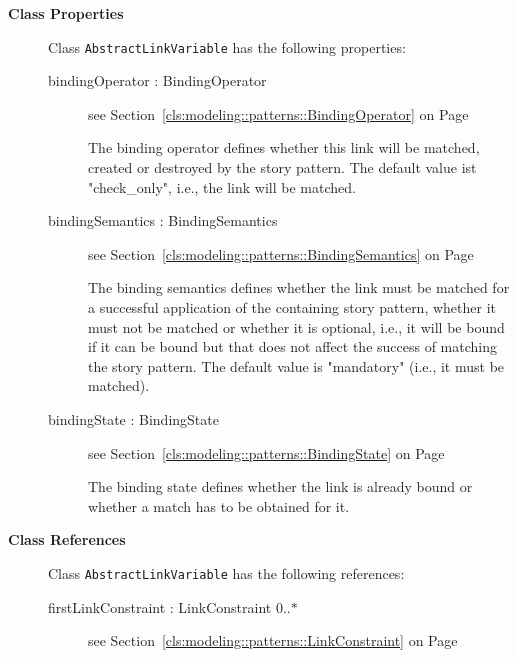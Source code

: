 \begin{description}

	\item[\textbf{Class Properties}] Class \texttt{AbstractLinkVariable} has the following properties:
	\begin{description}
\item[bindingOperator : BindingOperator 	]
see Section~\ref{cls:modeling::patterns::BindingOperator} on Page~\pageref{cls:modeling::patterns::BindingOperator}\hspace{\fill}
\nopagebreak


	
			
The binding operator defines whether this link will be matched, created or destroyed by the story pattern. The default value ist "check\_only", i.e., the link will be matched.	
		
	
\item[bindingSemantics : BindingSemantics 	]
see Section~\ref{cls:modeling::patterns::BindingSemantics} on Page~\pageref{cls:modeling::patterns::BindingSemantics}\hspace{\fill}
\nopagebreak


	
			
The binding semantics defines whether the link must be matched for a successful application of the containing story pattern, whether it must not be matched or whether it is optional, i.e., it will be bound if it can be bound but that does not affect the success of matching the story pattern. The default value is "mandatory" (i.e., it must be matched).	
		
	
\item[bindingState : BindingState 	]
see Section~\ref{cls:modeling::patterns::BindingState} on Page~\pageref{cls:modeling::patterns::BindingState}\hspace{\fill}
\nopagebreak


	
			
The binding state defines whether the link is already bound or whether a match has to be obtained for it.	
		
	
	\end{description}
	
	\item[\textbf{Class References}] Class \texttt{AbstractLinkVariable} has the following references:
	\begin{description}
\item[firstLinkConstraint : LinkConstraint 			0..$*$]
see Section~\ref{cls:modeling::patterns::LinkConstraint} on Page~\pageref{cls:modeling::patterns::LinkConstraint}\hspace{\fill}
\nopagebreak



\end{description}
\end{description}
